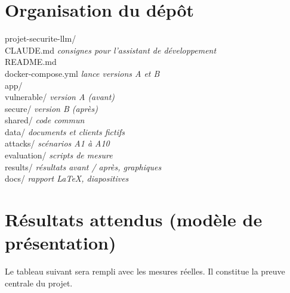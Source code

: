 \documentclass[11pt,a4paper]{article}
\begin{document}
\section{Organisation du dépôt}
\begin{tcolorbox}[colback=white, colframe=gris, boxrule=0.5pt, arc=1mm, title=Arborescence prévue, fonttitle=\bfseries\small, coltitle=white, colbacktitle=gris]
\small\ttfamily
projet-securite-llm/\\
\hspace*{1em}CLAUDE.md \hfill \textrm{\textit{consignes pour l'assistant de développement}}\\
\hspace*{1em}README.md\\
\hspace*{1em}docker-compose.yml \hfill \textrm{\textit{lance versions A et B}}\\
\hspace*{1em}app/\\
\hspace*{2em}vulnerable/ \hfill \textrm{\textit{version A (avant)}}\\
\hspace*{2em}secure/ \hfill \textrm{\textit{version B (après)}}\\
\hspace*{2em}shared/ \hfill \textrm{\textit{code commun}}\\
\hspace*{1em}data/ \hfill \textrm{\textit{documents et clients fictifs}}\\
\hspace*{1em}attacks/ \hfill \textrm{\textit{scénarios A1 à A10}}\\
\hspace*{1em}evaluation/ \hfill \textrm{\textit{scripts de mesure}}\\
\hspace*{1em}results/ \hfill \textrm{\textit{résultats avant / après, graphiques}}\\
\hspace*{1em}docs/ \hfill \textrm{\textit{rapport LaTeX, diapositives}}
\end{tcolorbox}

\section{Résultats attendus (modèle de présentation)}
Le tableau suivant sera rempli avec les mesures réelles. Il constitue la preuve centrale du projet.
\end{document}
